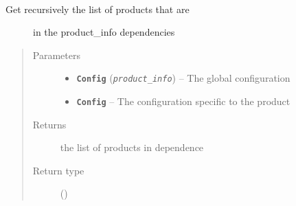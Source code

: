 \documentclass[a4paper,10pt,english]{sphinxmanual}
\begin{document}
\begin{fulllineitems}
\label{commands/apidoc/src:src.product.get_product_dependencies}~\begin{description}
\item[{Get recursively the list of products that are }] \leavevmode
in the product\_info dependencies

\end{description}
\begin{quote}\begin{description}
\item[{Parameters}] \leavevmode\begin{itemize}
\item {} 
\textbf{\texttt{Config}} (\emph{\texttt{product\_info}}) -- The global configuration

\item {} 
\textbf{\texttt{Config}} -- The configuration specific to 
the product

\end{itemize}

\item[{Returns}] \leavevmode
the list of products in dependence

\item[{Return type}] \leavevmode
{\hyperref[commands/apidoc/src:src.utilsSat.Path.list]{}} ()

\end{description}\end{quote}

\end{fulllineitems}

\end{document}
